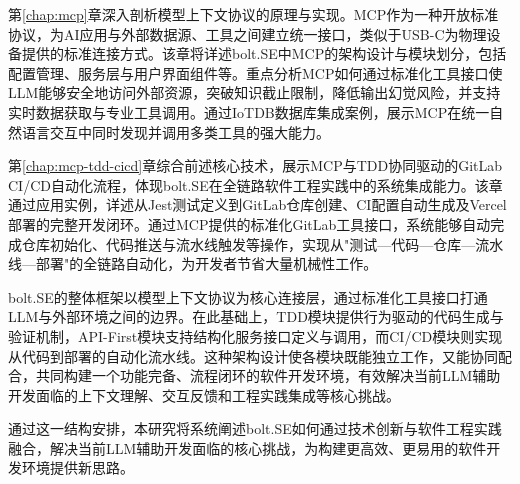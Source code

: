 第\ref{chap:mcp}章深入剖析模型上下文协议的原理与实现。MCP作为一种开放标准协议，为AI应用与外部数据源、工具之间建立统一接口，类似于USB-C为物理设备提供的标准连接方式。该章将详述bolt.SE中MCP的架构设计与模块划分，包括配置管理、服务层与用户界面组件等。重点分析MCP如何通过标准化工具接口使LLM能够安全地访问外部资源，突破知识截止限制，降低输出幻觉风险，并支持实时数据获取与专业工具调用。通过IoTDB数据库集成案例，展示MCP在统一自然语言交互中同时发现并调用多类工具的强大能力。

第\ref{chap:mcp-tdd-cicd}章综合前述核心技术，展示MCP与TDD协同驱动的GitLab CI/CD自动化流程，体现bolt.SE在全链路软件工程实践中的系统集成能力。该章通过应用实例，详述从Jest测试定义到GitLab仓库创建、CI配置自动生成及Vercel部署的完整开发闭环。通过MCP提供的标准化GitLab工具接口，系统能够自动完成仓库初始化、代码推送与流水线触发等操作，实现从"测试—代码—仓库—流水线—部署"的全链路自动化，为开发者节省大量机械性工作。

bolt.SE的整体框架以模型上下文协议为核心连接层，通过标准化工具接口打通LLM与外部环境之间的边界。在此基础上，TDD模块提供行为驱动的代码生成与验证机制，API-First模块支持结构化服务接口定义与调用，而CI/CD模块则实现从代码到部署的自动化流水线。这种架构设计使各模块既能独立工作，又能协同配合，共同构建一个功能完备、流程闭环的软件开发环境，有效解决当前LLM辅助开发面临的上下文理解、交互反馈和工程实践集成等核心挑战。

通过这一结构安排，本研究将系统阐述bolt.SE如何通过技术创新与软件工程实践融合，解决当前LLM辅助开发面临的核心挑战，为构建更高效、更易用的软件开发环境提供新思路。
